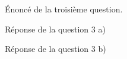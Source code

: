 
\begin{Question}
    Énoncé de la troisième question.   
\end{Question}

\begin{Answer}
    Réponse de la question 3 a)
\end{Answer}

\begin{Answer} 
    Réponse de la question 3 b)
\end{Answer}

